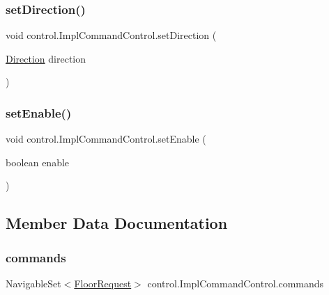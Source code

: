 \subsubsection{\texorpdfstring{setDirection()}{setDirection()}}
{\footnotesize\ttfamily void control.\+Impl\+Command\+Control.\+set\+Direction (\begin{DoxyParamCaption}\item[{\mbox{\hyperlink{enumcontrol_1_1command_1_1_direction}{Direction}}}]{direction }\end{DoxyParamCaption})\hspace{0.3cm}{\ttfamily [private]}}

\mbox{\label{classcontrol_1_1_impl_command_control_a5e4e08d530f169cec15f32d60255ac1c}} 
\subsubsection{\texorpdfstring{setEnable()}{setEnable()}}
{\footnotesize\ttfamily void control.\+Impl\+Command\+Control.\+set\+Enable (\begin{DoxyParamCaption}\item[{boolean}]{enable }\end{DoxyParamCaption})}



\subsection{Member Data Documentation}
\mbox{\label{classcontrol_1_1_impl_command_control_afc3d3dfd36511a07dd41e717df3b13f9}} 
\subsubsection{\texorpdfstring{commands}{commands}}
{\footnotesize\ttfamily Navigable\+Set$<$\mbox{\hyperlink{classcontrol_1_1command_1_1_floor_request}{Floor\+Request}}$>$ control.\+Impl\+Command\+Control.\+commands\hspace{0.3cm}{\ttfamily [private]}}

